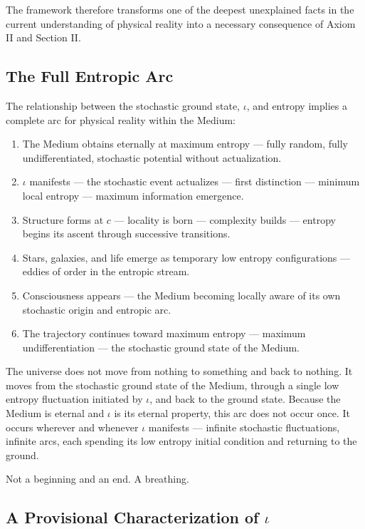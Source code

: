 \documentclass[11pt]{article}
\begin{document}
The framework therefore transforms one of the deepest unexplained facts in the
current understanding of physical reality into a necessary consequence of
Axiom II and Section II.
\subsection{The Full Entropic Arc}
\label{sec:orgac59f12}

The relationship between the stochastic ground state, \(\iota\), and entropy
implies a complete arc for physical reality within the Medium:

\begin{enumerate}
\item The Medium obtains eternally at maximum entropy — fully random, fully
undifferentiated, stochastic potential without actualization.
\item \(\iota\) manifests — the stochastic event actualizes — first distinction —
minimum local entropy — maximum information emergence.
\item Structure forms at \(c\) — locality is born — complexity builds — entropy
begins its ascent through successive transitions.
\item Stars, galaxies, and life emerge as temporary low entropy configurations —
eddies of order in the entropic stream.
\item Consciousness appears — the Medium becoming locally aware of its own
stochastic origin and entropic arc.
\item The trajectory continues toward maximum entropy — maximum undifferentiation
— the stochastic ground state of the Medium.
\end{enumerate}

The universe does not move from nothing to something and back to nothing. It
moves from the stochastic ground state of the Medium, through a single low
entropy fluctuation initiated by \(\iota\), and back to the ground state. Because
the Medium is eternal and \(\iota\) is its eternal property, this arc does not
occur once. It occurs wherever and whenever \(\iota\) manifests — infinite
stochastic fluctuations, infinite arcs, each spending its low entropy initial
condition and returning to the ground.

Not a beginning and an end. A breathing.
\subsection{A Provisional Characterization of \(\iota\)}
\label{sec:orgb18b6e1}
\end{document}
